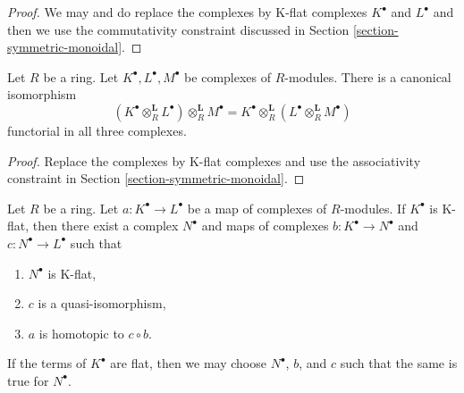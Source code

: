 \begin{proof}
We may and do replace the complexes by K-flat complexes $K^\bullet$ and
$L^\bullet$ and then we use the commutativity constraint discussed
in Section \ref{section-symmetric-monoidal}.
\end{proof}

\begin{lemma}
\label{lemma-triple-tensor-product}
Let $R$ be a ring. Let $K^\bullet, L^\bullet, M^\bullet$
be complexes of $R$-modules. There is a canonical isomorphism
$$
(K^\bullet \otimes_R^\mathbf{L} L^\bullet) \otimes_R^\mathbf{L} M^\bullet
=
K^\bullet \otimes_R^\mathbf{L} (L^\bullet \otimes_R^\mathbf{L} M^\bullet)
$$
functorial in all three complexes.
\end{lemma}

\begin{proof}
Replace the complexes by K-flat complexes and use the
associativity constraint in Section \ref{section-symmetric-monoidal}.
\end{proof}

\begin{lemma}
\label{lemma-factor-through-K-flat}
Let $R$ be a ring. Let $a : K^\bullet \to L^\bullet$ be a map of complexes
of $R$-modules. If $K^\bullet$ is K-flat, then there exist a complex
$N^\bullet$ and maps of complexes $b : K^\bullet \to N^\bullet$
and $c : N^\bullet \to L^\bullet$ such that
\begin{enumerate}
\item $N^\bullet$ is K-flat,
\item $c$ is a quasi-isomorphism,
\item $a$ is homotopic to $c \circ b$.
\end{enumerate}
If the terms of $K^\bullet$ are flat, then we may choose
$N^\bullet$, $b$, and $c$
such that the same is true for $N^\bullet$.
\end{lemma}

